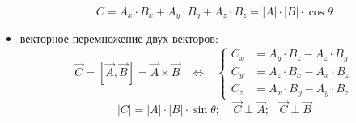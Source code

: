 \documentclass[12pt,epsfig,color,russian]{article}
\begin{document}
\begin{itemize}
\begin{displaymath}
 C = A_x\cdot B_x + A_y\cdot B_y + A_z\cdot B_z =|A|\cdot|B|\cdot \cos\theta
\end{displaymath}
\item векторное перемножение двух векторов:
 \begin{displaymath}
 \vec{C} = \left[\vec{A},\vec{B}\right] = \vec{A}\times\vec{B}\;\;\;\Leftrightarrow\;\;\;
 \left\{\begin{array}{cc}C_x &= A_y\cdot B_z - A_z\cdot B_y\\
                         C_y &= A_z\cdot B_x - A_x\cdot B_z\\
                         C_z &= A_x\cdot B_y - A_y\cdot B_z\end{array}\right.
 \end{displaymath}
 \begin{displaymath}
  |C|=|A|\cdot|B|\cdot\sin\theta;\;\;\;\; \vec{C}\perp\vec{A};\;\;\;\vec{C}\perp\vec{B}
\end{displaymath}
\end{itemize}
\end{document}
